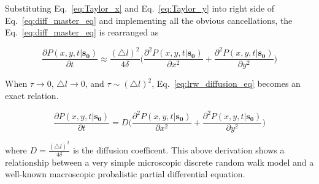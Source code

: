 Substituting Eq.~\ref{eq:Taylor_x} and Eq.~\ref{eq:Taylor_y} into
right side of Eq.~\ref{eq:diff_master_eq} and implementing
all the obvious cancellations, the Eq.~\ref{eq:diff_master_eq} is
rearranged as

\begin{equation}\label{eq:lrw_diffusion_eq}
  \frac{\partial P(x, y, t | \bm{s_0})}{\partial t} \approx
  \frac{(\triangle l)^2}{4 \delta} \Big( \frac{\partial ^2 P(x, y, t |
    \bm{s_0})}{\partial x^2} + \frac{\partial ^2 P(x, y, t |
    \bm{s_0})}{\partial y^2}\Big)
\end{equation}

When $\tau \rightarrow 0$, $\triangle l \rightarrow 0$, and $\tau \sim (\triangle l)^2$, Eq.~\ref{eq:lrw_diffusion_eq} becomes an exact
relation.

\begin{equation}\label{eq:limit_lrw_diffusion_eq}
  \frac{\partial P(x, y, t | \bm{s_0})}{\partial t} = D \Big( \frac{\partial ^2 P(x, y, t | \bm{s_0})}{\partial x^2} + \frac{\partial ^2 P(x, y, t |\bm{s_0})}{\partial y^2}\Big)
\end{equation}

where $D = \frac{(\triangle l)^2}{4 \delta}$ is the diffusion
coefficent. This above derivation shows a relationship between a very
simple microscopic discrete random walk model and a well-known
macroscopic probalistic partial differential equation.





    











